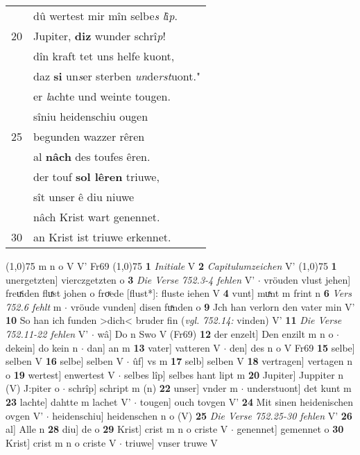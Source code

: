 \documentclass[8pt,a4paper,notitlepage]{article}
\begin{document}
\begin{table}[ht]
\begin{minipage}[t]{0.5\linewidth}
\begin{tabular}{rl}
 & dû wertest mir mîn selbe\textit{s l}î\textit{p}.\\ 
20 & Jupiter, \textbf{diz} wunder schrî\textit{p}!\\ 
 & dîn kraft tet uns helfe kuont,\\ 
 & daz \textbf{si} un\textit{s}er sterben \textit{un}de\textit{rst}uont."\\ 
 & er \textit{l}achte und weinte tougen.\\ 
 & sîniu heidenschiu ougen\\ 
25 & begunden wazzer rêren\\ 
 & al \textbf{nâch} des toufes êren.\\ 
 & der touf \textbf{sol lêren} triuwe,\\ 
 & sît unser ê diu niuwe\\ 
 & nâch Krist wart genennet.\\ 
30 & an Krist ist triuwe erkennet.\\ 
\end{tabular}
\scriptsize
\line(1,0){75} \newline
m n o V V' Fr69 \newline
\line(1,0){75} \newline
\textbf{1} \textit{Initiale} V  \textbf{2} \textit{Capitulumzeichen} V'  \newline
\line(1,0){75} \newline
\textbf{1} unergetzten] vierczgetzten o \textbf{3} \textit{Die Verse 752.3-4 fehlen} V'   $\cdot$ vröuden vlust jehen] freuͯiden fluͯst johen o froͮede [flust*]: fluste iehen V \textbf{4} vunt] muͯnt m frint n \textbf{6} \textit{Vers 752.6 fehlt} m   $\cdot$ vröude vunden] disen fuͯnden o \textbf{9} Jch han verlorn den vater min V' \textbf{10} So han ich funden >dich< bruder fin (\textit{vgl. 752.14:} vinden) V' \textbf{11} \textit{Die Verse 752.11-22 fehlen} V'   $\cdot$ wâ] Do n Swo V (Fr69) \textbf{12} der enzelt] Den enzilt m n o  $\cdot$ dekein] do kein n  $\cdot$ dan] an m \textbf{13} vater] vatteren V  $\cdot$ den] des n o V Fr69 \textbf{15} selbe] selben V \textbf{16} selbe] selben V  $\cdot$ ûf] vs m \textbf{17} selb] selben V \textbf{18} vertragen] vertagen n o \textbf{19} wertest] enwertest V  $\cdot$ selbes lîp] selbes hant lipt m \textbf{20} Jupiter] Juppiter n (V) J:piter o  $\cdot$ schrîp] schript m (n) \textbf{22} unser] vnder m  $\cdot$ understuont] det kunt m \textbf{23} lachte] dahtte m lachet V'  $\cdot$ tougen] ouch tovgen V' \textbf{24} Mit sinen heidenischen ovgen V'  $\cdot$ heidenschiu] heidenschen n o (V) \textbf{25} \textit{Die Verse 752.25-30 fehlen} V'  \textbf{26} al] Alle n \textbf{28} diu] de o \textbf{29} Krist] crist m n o criste V  $\cdot$ genennet] gemennet o \textbf{30} Krist] crist m n o criste V  $\cdot$ triuwe] vnser truwe V \newline
\end{minipage}
\end{table}
\end{document}
